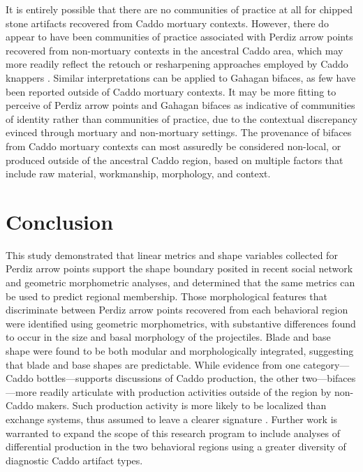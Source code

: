 \documentclass[smallextended]{svjour3}       %
\begin{document}
It is entirely possible that there are no communities of practice at all
for chipped stone artifacts recovered from Caddo mortuary contexts.
However, there do appear to have been communities of practice associated
with Perdiz arrow points recovered from non-mortuary contexts in the
ancestral Caddo area, which may more readily reflect the retouch or
resharpening approaches employed by Caddo knappers
\cite{RN9364,RN8486,RN11097}. Similar interpretations can be applied to
Gahagan bifaces, as few have been reported outside of Caddo mortuary
contexts. It may be more fitting to perceive of Perdiz arrow points and
Gahagan bifaces as indicative of communities of identity rather than
communities of practice, due to the contextual discrepancy evinced
through mortuary and non-mortuary settings. The provenance of bifaces
from Caddo mortuary contexts can most assuredly be considered non-local,
or produced outside of the ancestral Caddo region, based on multiple
factors that include raw material, workmanship, morphology, and context.

\hypertarget{conclusion}{%
\section{Conclusion}\label{conclusion}}

This study demonstrated that linear metrics and shape variables
collected for Perdiz arrow points support the shape boundary posited in
recent social network and geometric morphometric analyses, and
determined that the same metrics can be used to predict regional
membership. Those morphological features that discriminate between
Perdiz arrow points recovered from each behavioral region were
identified using geometric morphometrics, with substantive differences
found to occur in the size and basal morphology of the projectiles.
Blade and base shape were found to be both modular and morphologically
integrated, suggesting that blade and base shapes are predictable. While
evidence from one category---Caddo bottles---supports discussions of
Caddo production, the other two---bifaces---more readily articulate with
production activities outside of the region by non-Caddo makers. Such
production activity is more likely to be localized than exchange
systems, thus assumed to leave a clearer signature \cite{RN7019}.
Further work is warranted to expand the scope of this research program
to include analyses of differential production in the two behavioral
regions using a greater diversity of diagnostic Caddo artifact types.
\end{document}
